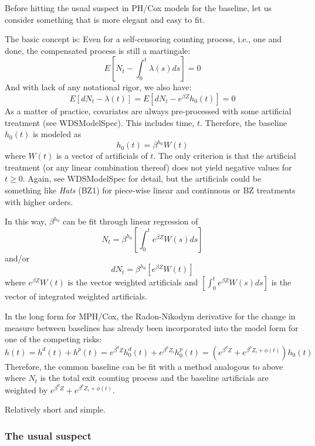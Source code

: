 \documentclass[10pt]{article}
\begin{document}
Before hitting the usual suspect in PH/Cox models for the baseline, let us consider something that is more elegant and easy to fit.

The basic concept is: Even for a self-censoring counting process, i.e., one and done, the compensated process is  still a martingale:
$$E[ N_t - \int_0^t\lambda(s)ds ] = 0 $$
And with lack of any notational rigor, we also have:
$$E[ dN_t - \lambda(t) ] = E[ dN_t - e^{\beta Z} h_0(t) ] = 0 $$
As a matter of practice, covariates are always pre-processed with some artificial treatment (see WDSModelSpec).  
This includes time, $t$.  Therefore, the baseline $h_0(t)$ is modeled as 
$$ h_0(t) = \beta^{h_0}W(t) $$
where $W(t)$ is a vector of artificials of $t$. The only criterion is that the artificial treatment (or any linear combination thereof) does not yield negative values
for $t\ge 0$.
Again, see WDSModelSpec for detail, but the artificials could be something like {\em Hats} (BZ1) for piece-wise linear and continuous
or BZ treatments with higher orders.

In this way, $\beta^{h_0}$ can be fit through linear regression of 
    $$ N_t = \beta^{h_0} [\int_0^te^{\beta Z}W(s)ds ] $$
and/or
    $$ dN_t = \beta^{h_0}[e^{\beta Z}W(t)] $$
where $e^{\beta Z}W(t)$ is the vector weighted artificials and $[\int_0^te^{\beta Z}W(s)ds]$ is the vector of integrated weighted artificials. 

In the long form for MPH/Cox, the Radon-Nikodym derivative for the change in measure between baselines has already been incorporated
into the model form for one of the competing risks:
$$ h(t) = h^d(t) + h^p(t) = e^{\beta^d Z}h^d_0(t) + e^{\beta^p Z_i}h^p_0(t) = ( e^{\beta^d Z} + e^{\beta^p Z_i + \phi(t)} ) h_0(t) $$
Therefore, the common baseline can be fit with a method analogous to above where $N_t$ is the total exit counting process and the 
baseline artificials are weighted by $e^{\beta^d Z} + e^{\beta^p Z_i + \phi(t)}$.

Relatively short and simple.


\subsubsection{The usual suspect}
\end{document}
